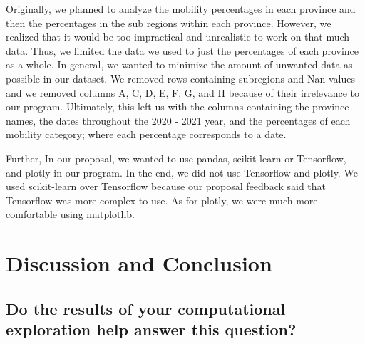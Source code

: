 \documentclass[fontsize=11pt]{article}
\begin{document}
    \indent Originally, we planned to analyze the mobility percentages in each province and then the percentages in the sub regions within each province. However, we realized that it would be too impractical and unrealistic to work on that much data. Thus, we limited the data we used to just the percentages of each province as a whole. In general, we wanted to minimize the amount of unwanted data as possible in our dataset. We removed rows containing subregions and Nan values and we removed columns A, C, D, E, F, G, and H because of their irrelevance to our program. Ultimately, this left us with the columns containing the province names, the dates throughout the 2020 - 2021 year, and the percentages of each mobility category; where each percentage corresponds to a date.

    Further, In our proposal, we wanted to use pandas, scikit-learn or Tensorflow, and plotly in our program. In the end, we did not use Tensorflow and plotly. We used scikit-learn over Tensorflow because our proposal feedback said that Tensorflow was more complex to use. As for plotly, we were much more comfortable using matplotlib.

    \newpage
    \section*{Discussion and Conclusion}

    \subsection{Do the results of your computational exploration help answer this question?}
\end{document}
